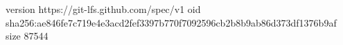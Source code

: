 version https://git-lfs.github.com/spec/v1
oid sha256:ae846fe7c719e4e3acd2fef3397b770f7092596cb2b8b9ab86d373df1376b9af
size 87544

